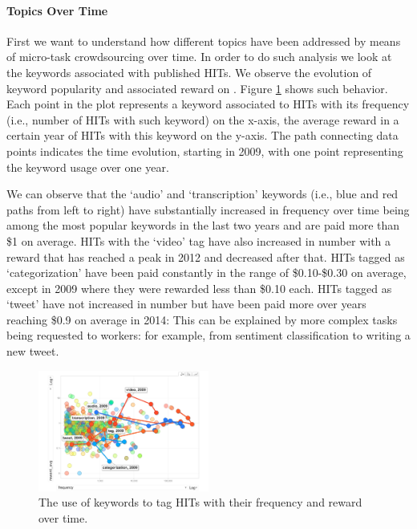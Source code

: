 \paragraph{Topics  Over Time}
First we want to understand how different topics have been addressed by means of micro-task crowdsourcing over time.
In order to do such analysis we look at the keywords associated with published HITs. We observe the evolution of keyword popularity and associated reward on \amt{}. 
Figure \ref{fig:tagEvolution} shows such behavior. Each point in the plot represents a keyword associated to HITs with its frequency (i.e., number of HITs with such keyword) on the x-axis, the average reward in a certain year of HITs with this keyword on the y-axis. The path connecting data points indicates the time evolution, starting in 2009, with one point representing the keyword usage over one year.

We can observe that the `audio' and `transcription' keywords (i.e., blue and red paths from left to right) have substantially increased in frequency over time being among the most popular keywords in the last two years and are paid more than \$1 on average.
HITs with the `video' tag have also increased in number with a reward that has reached a peak in 2012 and decreased after that.
HITs tagged as `categorization' have been paid constantly in the range of \$0.10-\$0.30 on average, except in 2009 where they were rewarded less than \$0.10 each.
HITs tagged as `tweet' have not increased in number but have been paid more over years reaching \$0.9 on average in 2014: This can be explained by more complex tasks being requested to workers: for example, from sentiment classification to writing a new tweet.

\begin{figure}[ht]
	\centering
		\includegraphics[width=0.5\textwidth]{figures/tagEvolution}
	\caption{The use of keywords to tag HITs with their frequency and reward over time.}
	\label{fig:tagEvolution}
\end{figure}


